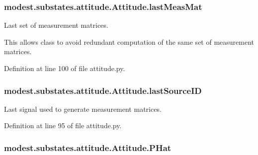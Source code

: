\subsubsection[{\texorpdfstring{last\+Meas\+Mat}{lastMeasMat}}]{\setlength{\rightskip}{0pt plus 5cm}modest.\+substates.\+attitude.\+Attitude.\+last\+Meas\+Mat}\hypertarget{classmodest_1_1substates_1_1attitude_1_1Attitude_add344f4323848f4ccdd9e59d699310a0}{}\label{classmodest_1_1substates_1_1attitude_1_1Attitude_add344f4323848f4ccdd9e59d699310a0}


Last set of measurement matrices. 

This allows class to avoid redundant computation of the same set of measurement matrices. 

Definition at line 100 of file attitude.\+py.

\subsubsection[{\texorpdfstring{last\+Source\+ID}{lastSourceID}}]{\setlength{\rightskip}{0pt plus 5cm}modest.\+substates.\+attitude.\+Attitude.\+last\+Source\+ID}\hypertarget{classmodest_1_1substates_1_1attitude_1_1Attitude_a0ec5bf8475ca5c175e4a516d2ac68fdf}{}\label{classmodest_1_1substates_1_1attitude_1_1Attitude_a0ec5bf8475ca5c175e4a516d2ac68fdf}


Last signal used to generate measurement matrices. 



Definition at line 95 of file attitude.\+py.

\subsubsection[{\texorpdfstring{P\+Hat}{PHat}}]{\setlength{\rightskip}{0pt plus 5cm}modest.\+substates.\+attitude.\+Attitude.\+P\+Hat}\hypertarget{classmodest_1_1substates_1_1attitude_1_1Attitude_a2f79616ca660e0cc1e628adf94738249}{}\label{classmodest_1_1substates_1_1attitude_1_1Attitude_a2f79616ca660e0cc1e628adf94738249}



